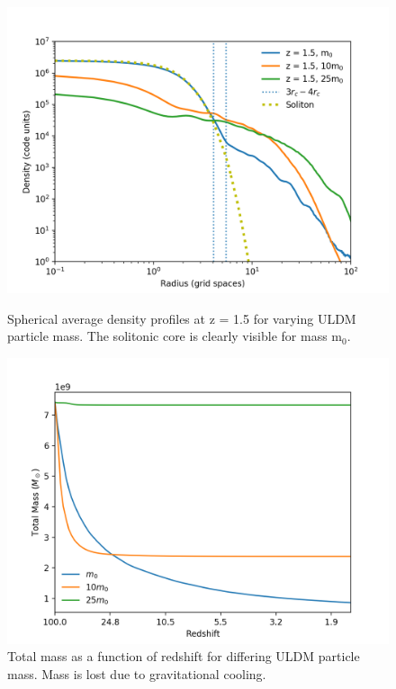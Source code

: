 \documentclass[a4paper,11pt]{article}
\begin{document}
\begin{figure}[!htb]
  \includegraphics[trim={1.5cm 0 1cm 0},scale=0.55]{final_profile_comparison.png}
  \caption{Spherical average density profiles at z = 1.5 for varying ULDM particle mass. The solitonic core is clearly visible for mass $\mathrm{m}_0$.}\label{fig:final_prof}
\endminipage\hfill
{}
  \includegraphics[trim={1.6cm 0 0 0.8cm},scale=0.55]{mass_loss_by_ULDM_mass.png}
  \caption{Total mass as a function of redshift for differing ULDM particle mass. Mass is lost due to gravitational cooling.}\label{fig:grav_cool}
\endminipage\hfill
\end{figure}
\end{document}
